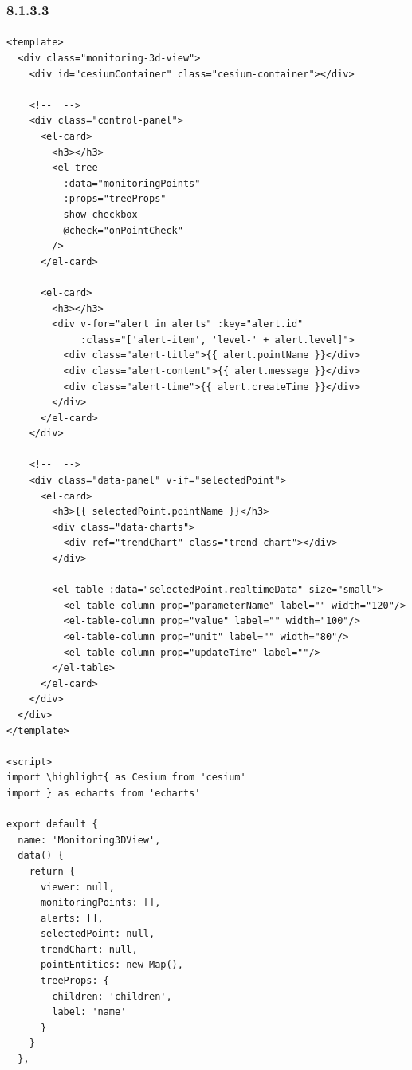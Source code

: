\hypertarget{section-47}{%
\subsubsection{8.1.3.3}\label{section-47}}

\hypertarget{section-48}{%
\paragraph{}\label{section-48}}

\begin{lstlisting}
<template>
  <div class="monitoring-3d-view">
    <div id="cesiumContainer" class="cesium-container"></div>
    
    <!--  -->
    <div class="control-panel">
      <el-card>
        <h3></h3>
        <el-tree
          :data="monitoringPoints"
          :props="treeProps"
          show-checkbox
          @check="onPointCheck"
        />
      </el-card>
      
      <el-card>
        <h3></h3>
        <div v-for="alert in alerts" :key="alert.id" 
             :class="['alert-item', 'level-' + alert.level]">
          <div class="alert-title">{{ alert.pointName }}</div>
          <div class="alert-content">{{ alert.message }}</div>
          <div class="alert-time">{{ alert.createTime }}</div>
        </div>
      </el-card>
    </div>
    
    <!--  -->
    <div class="data-panel" v-if="selectedPoint">
      <el-card>
        <h3>{{ selectedPoint.pointName }}</h3>
        <div class="data-charts">
          <div ref="trendChart" class="trend-chart"></div>
        </div>
        
        <el-table :data="selectedPoint.realtimeData" size="small">
          <el-table-column prop="parameterName" label="" width="120"/>
          <el-table-column prop="value" label="" width="100"/>
          <el-table-column prop="unit" label="" width="80"/>
          <el-table-column prop="updateTime" label=""/>
        </el-table>
      </el-card>
    </div>
  </div>
</template>

<script>
import \highlight{ as Cesium from 'cesium'
import } as echarts from 'echarts'

export default {
  name: 'Monitoring3DView',
  data() {
    return {
      viewer: null,
      monitoringPoints: [],
      alerts: [],
      selectedPoint: null,
      trendChart: null,
      pointEntities: new Map(),
      treeProps: {
        children: 'children',
        label: 'name'
      }
    }
  },
  

\end{lstlisting}
